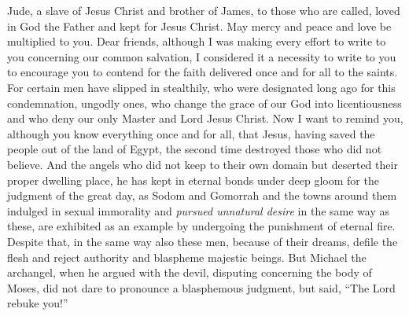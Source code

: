 
\begin{biblechapter} %
 Jude, a slave of Jesus Christ and brother of James, to those who are called, loved in God the Father and kept for Jesus Christ.
\verse May mercy and peace and love be multiplied to you.
 Dear friends, although I was making every effort to write to you concerning our common salvation, I considered it a necessity to write to you to encourage you to contend for the faith delivered once and for all to the saints.
\verse For certain men have slipped in stealthily, who were designated long ago for this condemnation, ungodly ones, who change the grace of our God into licentiousness and who deny our only Master and Lord Jesus Christ.
 Now I want to remind you, although you know everything once and for all, that Jesus, having saved the people out of the land of Egypt, the second time destroyed those who did not believe.
\verse And the angels who did not keep to their own domain but deserted their proper dwelling place, he has kept in eternal bonds under deep gloom for the judgment of the great day,
\verse as Sodom and Gomorrah and the towns around them indulged in sexual immorality and \textit{pursued unnatural desire} in the same way as these, are exhibited as an example by undergoing the punishment of eternal fire.
\verse Despite that, in the same way also these men, because of their dreams, defile the flesh and reject authority and blaspheme majestic beings.
\verse But Michael the archangel, when he argued with the devil, disputing concerning the body of Moses, did not dare to pronounce a blasphemous judgment, but said, “The Lord rebuke you!”

\end{biblechapter}
